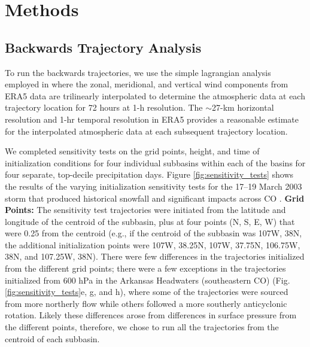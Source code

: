 \documentclass[draft]{agujournal2019}
\begin{document}
\section{Methods}
\label{sec:methods}
\subsection{Backwards Trajectory Analysis}

To run the backwards trajectories, we use the simple lagrangian analysis employed in  where the zonal, meridional, and vertical wind components from ERA5 data are trilinearly interpolated to determine the atmospheric data at each trajectory location for 72 hours at 1-h resolution. The $\sim$27-km horizontal resolution and 1-hr temporal resolution in ERA5 provides a reasonable estimate for the interpolated atmospheric data at each subsequent trajectory location.

We completed sensitivity tests on the grid points, height, and time of initialization conditions for four individual subbasins within each of the basins for four separate, top-decile precipitation days. Figure \ref{fig:sensitivity_tests} shows the results of the varying initialization sensitivity tests for the 17--19 March 2003 storm that produced historical snowfall and significant impacts across CO \cite{Wesley2013Extreme2003}. \textbf{Grid Points:} The sensitivity test trajectories were initiated from the latitude and longitude of the centroid of the subbasin, plus at four points (N, S, E, W) that were 0.25\textdegree{} from the centroid (e.g., if the centroid of the subbasin was 107\textdegree W, 38\textdegree N, the additional initialization points were 107\textdegree W, 38.25\textdegree N, 107\textdegree W, 37.75\textdegree N, 106.75\textdegree W, 38\textdegree N, and 107.25\textdegree W, 38\textdegree N). There were few differences in the trajectories initialized from the different grid points; there were a few exceptions in the trajectories initialized from 600 hPa in the Arkansas Headwaters (southeastern CO) (Fig. \ref{fig:sensitivity_tests}e, g, and h), where some of the trajectories were sourced from more northerly flow while others followed a more southerly anticyclonic rotation. Likely these differences arose from differences in surface pressure from the different points, therefore, we chose to run all the trajectories from the centroid of each subbasin.
\end{document}
